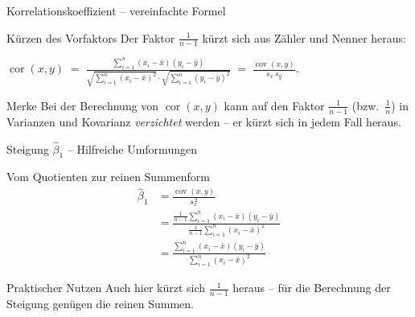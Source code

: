 \documentclass[aspectratio=169,11pt]{beamer}
\begin{document}
\begin{frame}{Korrelationskoeffizient -- vereinfachte Formel}
  \begin{block}{Kürzen des Vorfaktors}
    Der Faktor $\tfrac{1}{n-1}$ kürzt sich aus Zähler und Nenner heraus:
    \begin{center}
      $\displaystyle
        \operatorname{cor}(x,y) \;=\;
        \frac{\sum_{i=1}^{n}(x_i-\bar{x})(y_i-\bar{y})}
             {\sqrt{\sum_{i=1}^{n}(x_i-\bar{x})^{2}}
              \cdot
              \sqrt{\sum_{i=1}^{n}(y_i-\bar{y})^{2}}}
        \;=\; \frac{\operatorname{cov}(x,y)}{s_x\,s_y}.$
    \end{center}
  \end{block}

  \begin{alertblock}{Merke}
    Bei der Berechnung von $\operatorname{cor}(x,y)$ kann auf den
    Faktor $\tfrac{1}{n-1}$ (bzw.\ $\tfrac{1}{n}$) in Varianzen und
    Kovarianz \emph{verzichtet} werden -- er kürzt sich in jedem
    Fall heraus.
  \end{alertblock}
\end{frame}

\begin{frame}{Steigung $\hat{\beta}_1$ -- Hilfreiche Umformungen}
  \begin{block}{Vom Quotienten zur reinen Summenform}
    \begin{align*}
      \hat{\beta}_1
        &= \frac{\operatorname{cov}(x,y)}{s_x^{\,2}} \\[0.3em]
        &= \frac{\tfrac{1}{n-1}\sum_{i=1}^{n}(x_i-\bar{x})(y_i-\bar{y})}
                {\tfrac{1}{n-1}\sum_{i=1}^{n}(x_i-\bar{x})^{2}} \\[0.3em]
        &= \frac{\sum_{i=1}^{n}(x_i-\bar{x})(y_i-\bar{y})}
                {\sum_{i=1}^{n}(x_i-\bar{x})^{2}}
    \end{align*}
  \end{block}

  \begin{exampleblock}{Praktischer Nutzen}
    Auch hier kürzt sich $\tfrac{1}{n-1}$ heraus -- für die
    Berechnung der Steigung genügen die reinen Summen.
  \end{exampleblock}
\end{frame}
\end{document}
